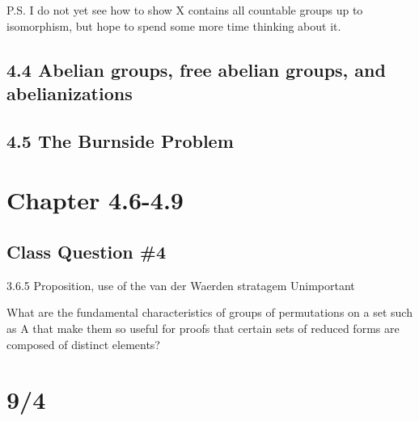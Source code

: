 \documentclass[12pt]{article}
\begin{document}
P.S. I do not yet see how to show X contains all countable groups up to isomorphism, but hope to spend some more time thinking about it.


\subsection{4.4 Abelian groups, free abelian groups, and abelianizations}

\subsection{4.5 The Burnside Problem}

\section{Chapter 4.6-4.9}

\subsection{Class Question \#4}

3.6.5 Proposition, use of the van der Waerden stratagem
Unimportant

What are the fundamental characteristics of groups of permutations on a set such as A that make them so useful for proofs that certain sets of reduced forms are composed of distinct elements?

\section{9/4}
\end{document}
